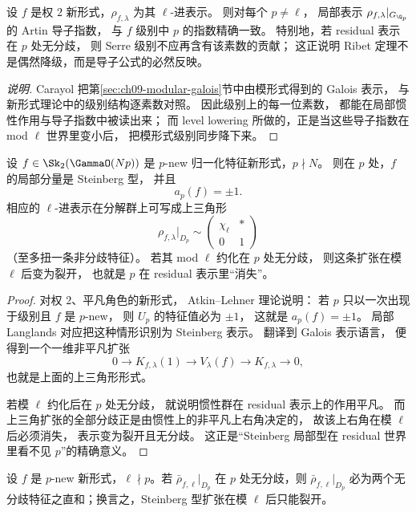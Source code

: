 \begin{proposition}
\label{prop:ch09-carayol-conductor}
设 $f$ 是权 $2$ 新形式，$\rho_{f,\lambda}$ 为其 $\ell$-进表示。
则对每个 $p\neq \ell$，
局部表示 $\rho_{f,\lambda}|_{G_{\Q_p}}$ 的 Artin 导子指数，
与 $f$ 级别中 $p$ 的指数精确一致。
特别地，若 residual 表示在 $p$ 处无分歧，
则 Serre 级别不应再含有该素数的贡献；
这正说明 Ribet 定理不是偶然降级，而是导子公式的必然反映。
\end{proposition}

\begin{proof}[说明]
Carayol 把第\ref{sec:ch09-modular-galois}节中由模形式得到的 Galois 表示，
与新形式理论中的级别结构逐素数对照。
因此级别上的每一位素数，
都能在局部惯性作用与导子指数中被读出来；
而 level lowering 所做的，正是当这些导子指数在 mod $\ell$ 世界里变小后，
把模形式级别同步降下来。
\end{proof}

\begin{proposition}
\label{prop:ch09-steinberg-local}
设 $f\in \Sk_2(\GammaO(Np))$ 是 $p$-new 归一化特征新形式，$p\nmid N$。
则在 $p$ 处，$f$ 的局部分量是 Steinberg 型，
并且
\[
  a_p(f)=\pm 1.
\]
相应的 $\ell$-进表示在分解群上可写成上三角形
\[
  \rho_{f,\lambda}|_{D_p}\sim
  \begin{pmatrix}
    \chi_\ell & *\\ 0 & 1
  \end{pmatrix}
\]
（至多扭一条非分歧特征）。
若其 mod $\ell$ 约化在 $p$ 处无分歧，
则这条扩张在模 $\ell$ 后变为裂开，
也就是 $p$ 在 residual 表示里“消失”。
\end{proposition}

\begin{proof}
对权 $2$、平凡角色的新形式，
Atkin--Lehner 理论说明：
若 $p$ 只以一次出现于级别且 $f$ 是 $p$-new，
则 $U_p$ 的特征值必为 $\pm1$，
这就是 $a_p(f)=\pm1$。
局部 Langlands 对应把这种情形识别为 Steinberg 表示。
翻译到 Galois 表示语言，
便得到一个一维非平凡扩张
\[
  0\to K_{f,\lambda}(1)\to V_\lambda(f)\to K_{f,\lambda}\to 0,
\]
也就是上面的上三角形形式。

若模 $\ell$ 约化后在 $p$ 处无分歧，
就说明惯性群在 residual 表示上的作用平凡。
而上三角扩张的全部分歧正是由惯性上的非平凡上右角决定的，
故该上右角在模 $\ell$ 后必须消失，
表示变为裂开且无分歧。
这正是“Steinberg 局部型在 residual 世界里看不见 $p$”的精确意义。
\end{proof}

\begin{lemma}
\label{lem:ch09-steinberg-unramified-conflict}
设 $f$ 是 $p$-new 新形式，$\ell \nmid p$。若 $\bar\rho_{f,\ell}|_{D_p}$ 在 $p$ 处无分歧，则
$\bar\rho_{f,\ell}|_{D_p}$ 必为两个无分歧特征之直和；换言之，Steinberg 型扩张在模 $\ell$ 后只能裂开。
\end{lemma}

